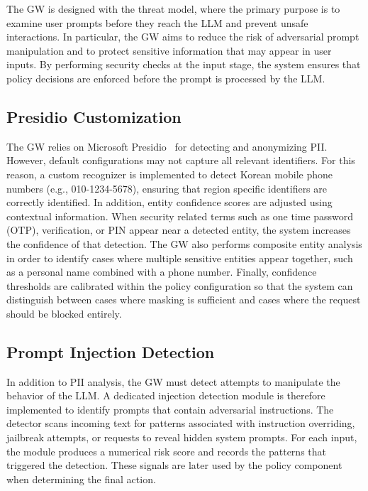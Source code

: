 \documentclass[conference]{IEEEtran}
\begin{document}
The GW is designed with the threat model, where the primary purpose is to examine user prompts before they reach the LLM and prevent unsafe interactions. In particular, the GW aims to reduce the risk of adversarial prompt manipulation and to protect sensitive information that may appear in user inputs. By performing security checks at the input stage, the system ensures that policy decisions are enforced before the prompt is processed by the LLM.

\subsection{Presidio Customization}

The GW relies on Microsoft Presidio~\cite{presidio2023} for detecting and anonymizing PII. However, default configurations may not capture all relevant identifiers. For this reason, a custom recognizer is implemented to detect Korean mobile phone numbers (e.g., 010-1234-5678), ensuring that region specific identifiers are correctly identified. In addition, entity confidence scores are adjusted using contextual information. When security related terms such as one time password (OTP), verification, or PIN appear near a detected entity, the system increases the confidence of that detection. The GW also performs composite entity analysis in order to identify cases where multiple sensitive entities appear together, such as a personal name combined with a phone number. Finally, confidence thresholds are calibrated within the policy configuration so that the system can distinguish between cases where masking is sufficient and cases where the request should be blocked entirely.


\subsection{Prompt Injection Detection}

In addition to PII analysis, the GW must detect attempts to manipulate the behavior of the LLM. A dedicated injection detection module is therefore implemented to identify prompts that contain adversarial instructions. The detector scans incoming text for patterns associated with instruction overriding, jailbreak attempts, or requests to reveal hidden system prompts. For each input, the module produces a numerical risk score and records the patterns that triggered the detection. These signals are later used by the policy component when determining the final action. %
\end{document}
